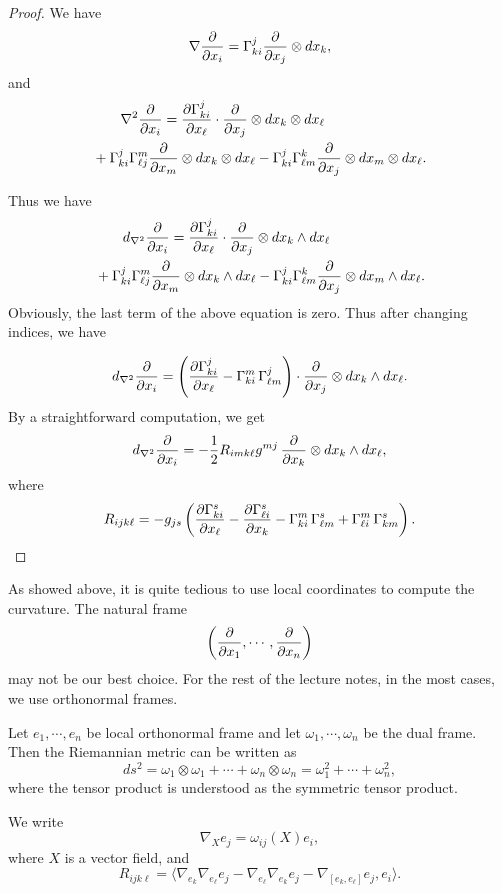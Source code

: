 \begin{proof}
We have
\[
\nabla\frac{\partial}{\partial x_i}=\Gamma_{ki}^j\frac{\partial}{\partial x_j}\otimes dx_k,
\]
and 
\begin{align*}
&
\qquad \nabla^2\frac{\partial}{\partial x_i}=\frac{\partial \Gamma_{ki}^j}{\partial x_\ell}\cdot\frac{\partial}{\partial x_j}\otimes dx_k\otimes dx_\ell\\
&+\Gamma_{ki}^j\Gamma_{\ell j}^m\frac{\partial}{\partial x_m}\otimes dx_k\otimes dx_\ell
-\Gamma_{ki}^j\Gamma_{\ell m}^k\frac{\partial}{\partial x_j}
\otimes dx_m\otimes dx_\ell.
\end{align*}

Thus we have
\begin{align*}
&
\qquad d_{\nabla^2}\frac{\partial}{\partial x_i}=\frac{\partial \Gamma_{ki}^j}{\partial x_\ell}\cdot\frac{\partial}{\partial x_j}\otimes dx_k\wedge  dx_\ell\\
&+\Gamma_{ki}^j\Gamma_{\ell j}^m\frac{\partial}{\partial x_m}\otimes dx_k\wedge dx_\ell
-\Gamma_{ki}^j\Gamma_{\ell m}^k\frac{\partial}{\partial x_j}
\otimes dx_m\wedge dx_\ell.
\end{align*}
Obviously, the last term of the above equation is zero. Thus after changing indices, we have

\[
d_{\nabla^2}\frac{\partial}{\partial x_i}=\left(\frac{\partial \Gamma_{ki}^j}{\partial x_\ell}-\Gamma_{ki}^m\,\Gamma_{\ell m}^j\right) \cdot\frac{\partial}{\partial x_j}\otimes dx_k\wedge  dx_\ell.
\]
By a straightforward computation, we get
\[
d_{\nabla^2}\frac{\partial}{\partial x_i}=-\frac 12 R_{imk\ell}g^{mj}\,\frac{\partial}{\partial x_k}\otimes dx_k\wedge dx_\ell,
\]
where 
\[
R_{ijk\ell}=-g_{js}\left(\frac{\partial \Gamma_{ki}^s}{\partial x_\ell}-\frac{\partial \Gamma_{\ell i}^s}{\partial x_k}-\Gamma_{ki}^m\,\Gamma_{\ell m}^s+\Gamma_{\ell i}^m\,\Gamma_{k m}^s
\right).
\]
\end{proof}




As showed above, it is quite tedious to use local coordinates to compute the curvature. The natural frame
\[
\left(\frac{\partial}{\partial x_1},\cdots,\frac{\partial}{\partial x_n}\right)
\]
may not be our best choice. For the rest of the lecture notes, in the most cases, we use orthonormal frames.

Let $e_1,\cdots,e_n$ be local orthonormal frame and let $\omega_1,\cdots,\omega_n$ be the dual frame. Then the Riemannian metric can be written as
\[
ds^2=\omega_1\otimes\omega_1+\cdots+\omega_n\otimes\omega_n=\omega_1^2+\cdots+\omega_n^2,
\]
where the tensor product is understood as the symmetric tensor product.

We write
\[
\nabla_X e_j=\omega_{ij}(X) e_i,
\]
where $X$ is a vector field,
and 
\[
R_{ijk\ell}=\langle \nabla_{e_k}\nabla_{e_\ell} e_j-\nabla_{e_\ell}\nabla_{e_k} e_j
-\nabla_{[e_k,e_\ell]}e_j,e_i\rangle.
\]

